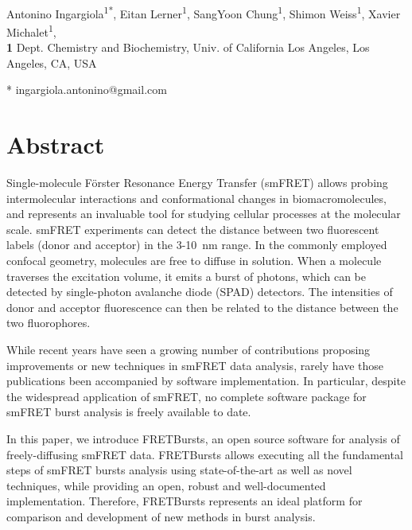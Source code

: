 \documentclass[10pt,letterpaper]{article}
\date{}
\begin{document}
\vspace*{0.35in}

\begin{flushleft}
{\Large
\textbf\newline{}
}
\newline
\\
Antonino Ingargiola\textsuperscript{1*},
Eitan Lerner\textsuperscript{1},
SangYoon Chung\textsuperscript{1},
Shimon Weiss\textsuperscript{1},
Xavier Michalet\textsuperscript{1},
\\
\bigskip
\textbf{1} Dept. Chemistry and Biochemistry, Univ. of California Los Angeles, Los Angeles, CA, USA
\bigskip

* ingargiola.antonino@gmail.com
\end{flushleft}


\section*{Abstract}
Single-molecule Förster Resonance Energy Transfer (smFRET) allows
probing intermolecular interactions and conformational changes in
biomacromolecules, and represents an invaluable tool for studying
cellular processes at the molecular scale. smFRET experiments can
detect the distance between two fluorescent labels (donor and acceptor)
in the 3-10~nm range. In the commonly employed confocal geometry,
molecules are free to diffuse in solution. When a molecule traverses
the excitation volume, it emits a burst of photons, which can be detected
by single-photon avalanche diode (SPAD) detectors. The intensities of
donor and acceptor fluorescence can then be related to the distance
between the two fluorophores.

While recent years have seen a growing number of contributions 
proposing improvements or new techniques in smFRET data analysis, 
rarely have those publications been accompanied by software implementation. 
In particular, despite the widespread application of smFRET, no complete 
software package for smFRET burst analysis is freely available to date.
 
In this paper, we introduce FRETBursts, an open source software
for analysis of freely-diffusing smFRET data.
FRETBursts allows executing all the fundamental steps of smFRET bursts
analysis using state-of-the-art as well as novel techniques,
while providing an open, robust and well-documented implementation.
Therefore, FRETBursts represents an ideal platform for comparison
and development of new methods in burst analysis.
\end{document}
